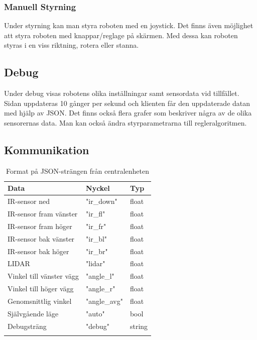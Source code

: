 \documentclass[a4paper,titlepage,12pt]{article}
\begin{document}
    \subsubsection{Manuell Styrning}
    Under styrning kan man styra roboten med en joystick. Det finns även möjlighet att
    styra roboten med knappar/reglage på skärmen. Med dessa kan roboten styras i en viss 
    riktning, rotera eller stanna.

    \subsection{Debug}
	Under debug visas robotens olika inställningar samt sensordata vid
    tillfället. Sidan uppdateras 10 gånger per sekund och klienten får den
    uppdaterade datan med hjälp av JSON. Det finns också flera grafer
    som beskriver några av de olika sensorernas data. Man kan också ändra
    styrparametrarna till regleralgoritmen.
	
    \subsection{Kommunikation}
	\label{gui:kommunikation}

	\begin{longtable}[c]{l l l }
        \textbf{Data} & \textbf{Nyckel} & \textbf{Typ} \\ \midrule
        IR-sensor ned & "ir\_down" & float \\
        IR-sensor fram vänster & "ir\_fl" & float \\
        IR-sensor fram höger & "ir\_fr" & float \\
        IR-sensor bak vänster & "ir\_bl" & float \\
        IR-sensor bak höger & "ir\_br" & float \\
        LIDAR & "lidar" & float \\
        Vinkel till vänster vägg & "angle\_l" & float \\
        Vinkel till höger vägg & "angle\_r" & float \\
        Genomsnittlig vinkel & "angle\_avg" & float \\
        Självgående läge & "auto" & bool \\
        Debugsträng & "debug" & string \\

		\caption{Format på JSON-strängen från
        centralenheten\label{table:guimessagesfromcentral}}
	\end{longtable}
\end{document}
